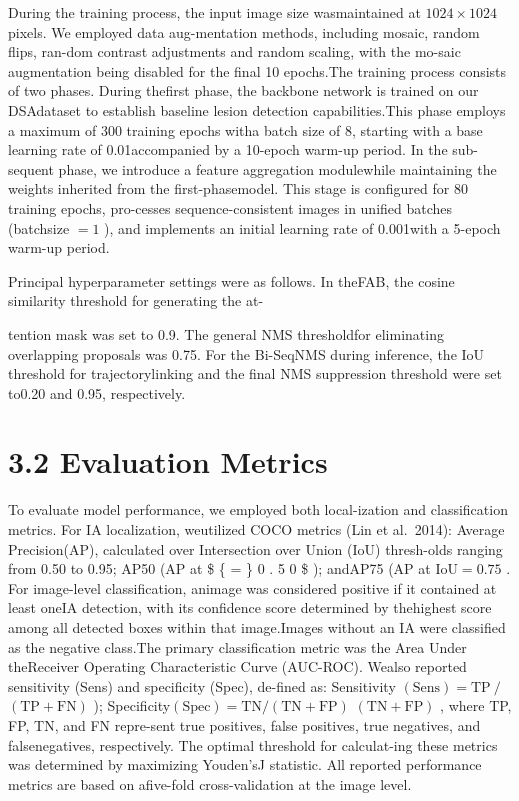 \documentclass[
  10
]{article}
\begin{document}
During the training process, the input image size wasmaintained at
\(1 0 2 4 \times 1 0 2 4\) pixels. We employed data aug-mentation
methods, including mosaic, random flips, ran-dom contrast adjustments
and random scaling, with the mo-saic augmentation being disabled for the
final 10 epochs.The training process consists of two phases. During
thefirst phase, the backbone network is trained on our DSAdataset to
establish baseline lesion detection capabilities.This phase employs a
maximum of 300 training epochs witha batch size of 8, starting with a
base learning rate of 0.01accompanied by a 10-epoch warm-up period. In
the sub-sequent phase, we introduce a feature aggregation modulewhile
maintaining the weights inherited from the first-phasemodel. This stage
is configured for 80 training epochs, pro-cesses sequence-consistent
images in unified batches (batchsize \(= 1\) ), and implements an
initial learning rate of 0.001with a 5-epoch warm-up period.

Principal hyperparameter settings were as follows. In theFAB, the cosine
similarity threshold for generating the at-

tention mask was set to 0.9. The general NMS thresholdfor eliminating
overlapping proposals was 0.75. For the Bi-SeqNMS during inference, the
IoU threshold for trajectorylinking and the final NMS suppression
threshold were set to0.20 and 0.95, respectively.

\section{3.2 Evaluation Metrics}\label{evaluation-metrics}

To evaluate model performance, we employed both local-ization and
classification metrics. For IA localization, weutilized COCO metrics
(Lin et al.~2014): Average Precision(AP), calculated over Intersection
over Union (IoU) thresh-olds ranging from 0.50 to 0.95; AP50 (AP at
\$ \{ = \} 0 . 5 0 \$ ); andAP75 (AP at
\(\mathrm { I o U } { = } 0 . 7 5\) . For image-level classification,
animage was considered positive if it contained at least oneIA
detection, with its confidence score determined by thehighest score
among all detected boxes within that image.Images without an IA were
classified as the negative class.The primary classification metric was
the Area Under theReceiver Operating Characteristic Curve (AUC-ROC).
Wealso reported sensitivity (Sens) and specificity (Spec), de-fined as:
Sensitivity \(( \mathrm { S e n s } ) = \mathrm { T P } ~ /\)
\(( \mathrm { T P } + \mathrm { F N } )\) );
Specificity\(\mathrm { ( S p e c ) = T N / \left( T N + F P \right) }\)
\(( \mathrm { T N } + \mathrm { F P } )\) , where TP, FP, TN, and FN
repre-sent true positives, false positives, true negatives, and
falsenegatives, respectively. The optimal threshold for calculat-ing
these metrics was determined by maximizing Youden'sJ statistic. All
reported performance metrics are based on afive-fold cross-validation at
the image level.
\end{document}
